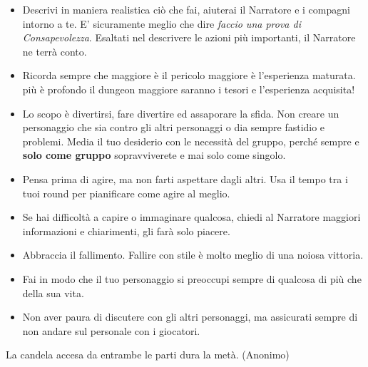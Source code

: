 \begin{multicols}{2}
\begin{itemize}[leftmargin=*]
\item
Descrivi in maniera realistica ciò che fai, aiuterai il Narratore e i compagni intorno a te. E' sicuramente meglio che dire \emph{faccio una prova di Consapevolezza}. Esaltati nel descrivere le azioni più importanti, il Narratore ne terrà conto.


\item
Ricorda sempre che maggiore è il pericolo maggiore è l'esperienza maturata. più è profondo il dungeon maggiore saranno i tesori e l'esperienza acquisita!

\item
Lo scopo è divertirsi, fare divertire ed assaporare la sfida. Non creare un personaggio che sia contro gli altri personaggi o dia sempre fastidio e problemi. Media il tuo desiderio con le necessità del gruppo, perché sempre e \textbf{solo come gruppo} sopravviverete e mai solo come singolo.

\item
Pensa prima di agire, ma non farti aspettare dagli altri. Usa il tempo tra i tuoi round per pianificare come agire al meglio.

\item
Se hai difficoltà a capire o immaginare qualcosa, chiedi al Narratore maggiori informazioni e chiarimenti, gli farà solo piacere.

\item
Abbraccia il fallimento. Fallire con stile è molto meglio di una noiosa vittoria.

\item
Fai in modo che il tuo personaggio si preoccupi sempre di qualcosa di più che della sua vita.

\item
Non aver paura di discutere con gli altri personaggi, ma assicurati sempre di non andare sul personale con i giocatori.

\end{itemize}

\end{multicols}

\vfill

\begin{changemargin}{0.3cm}{0.3cm}\begin{enfasi}{
\begin{center}
La candela accesa da entrambe le parti dura la metà. (Anonimo)
\end{center}
}\end{enfasi}\end{changemargin}



